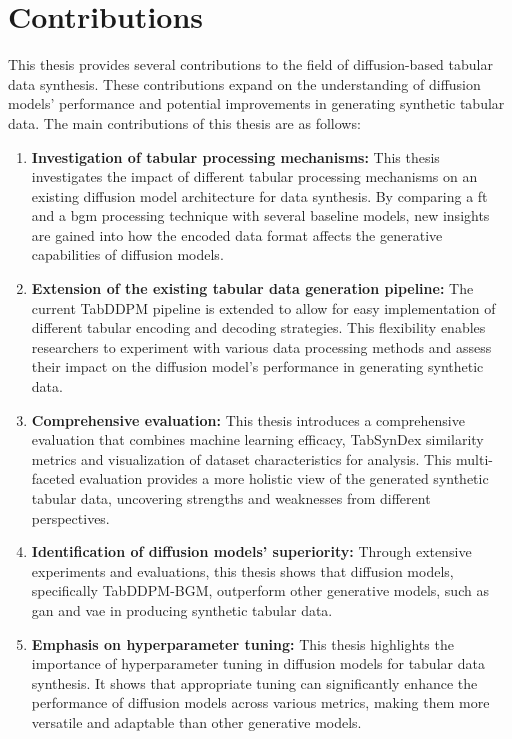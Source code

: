 \section{Contributions}
\label{ch:intro-contributions}
This thesis provides several contributions to the field of diffusion-based tabular data synthesis.
These contributions expand on the understanding of diffusion \glspl{model}' performance and potential improvements in generating synthetic tabular data.
The main contributions of this thesis are as follows:
\begin{enumerate}
	\item \textbf{Investigation of tabular processing mechanisms:}
	      This thesis investigates the impact of different tabular processing mechanisms on an existing diffusion \gls{model} architecture for data synthesis.
	      By comparing a \acrfull{ft} and a \acrfull{bgm} processing technique with several baseline \glspl{model}, new insights are gained into how the encoded data format affects the generative capabilities of diffusion \glspl{model}.
	\item \textbf{Extension of the existing tabular data generation pipeline:}
	      The current TabDDPM \cite{kotelnikov2022TabDDPMModellingTabular} pipeline is extended to allow for easy implementation of different tabular encoding and decoding strategies.
	      This flexibility enables researchers to experiment with various data processing methods and assess their impact on the diffusion \gls{model}'s performance in generating synthetic data.
	\item \textbf{Comprehensive evaluation:}
	      This thesis introduces a comprehensive evaluation that combines machine learning efficacy,
	      TabSynDex similarity metrics and visualization of dataset characteristics for analysis.
	      This multi-faceted evaluation provides a more holistic view of the generated synthetic tabular data,
	      uncovering strengths and weaknesses from different perspectives.
	\item \textbf{Identification of diffusion \glspl{model}' superiority:}
	      Through extensive experiments and evaluations, this thesis shows that diffusion \glspl{model}, specifically TabDDPM-BGM, outperform other generative \glspl{model}, such as \gls{gan} and \gls{vae} in producing synthetic tabular data.
	\item \textbf{Emphasis on hyperparameter tuning:}
	      This thesis highlights the importance of hyperparameter tuning in diffusion \glspl{model} for tabular data synthesis.
	      It shows that appropriate tuning can significantly enhance the performance of diffusion \glspl{model} across various metrics,
	      making them more versatile and adaptable than other generative \glspl{model}.
\end{enumerate}

